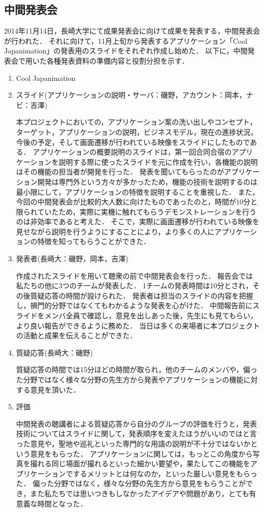 \subsection{中間発表会} 
\par
2014年11月14日，長崎大学にて成果発表会に向けて成果を発表する，中間発表会が行われた．
それに向けて，11月上旬から発表するアプリケーション「Cool Japanimation」の発表用のスライドをそれぞれ作成し始めた．
以下に，中間発表会で用いた各種発表資料の準備内容と役割分担を示す．
\begin{enumerate}
\item Cool Japanimation　
\par
\item スライド(アプリケーションの説明・サーバ：磯野，アカウント：岡本，ナビ：吉澤) 
\par
本プロジェクトにおいての，アプリケーション案の洗い出しやコンセプト，ターゲット，アプリケーションの説明，ビジネスモデル，現在の進捗状況，今後の予定，そして画面遷移が行われている映像をスライドにしたものである．
アプリケーションの概要説明のスライドは，第一回合同合宿のアプリケーションを説明する際に使ったスライドを元に作成を行い，各機能の説明はその機能の担当者が開発を行った．
発表を聞いてもらったのがアプリケーション開発は専門外という方々が多かったため，機能の技術を説明するのは最小限にして，アプリケーションの特徴を説明することを重視した．
また，今回の中間発表会が比較的大人数に向けたものであったのと，時間が10分と限られていたため，実際に実機に触れてもらうデモンストレーションを行うのは非効率であると考えた．
そこで，実際に画面遷移が行われている映像を見せながら説明を行うようにすることにより，より多くの人にアプリケーションの特徴を知ってもらうことができた．
\item 発表者(長崎大：磯野，岡本，吉澤)
\par
作成されたスライドを用いて聴衆の前で中間発表会を行った．
報告会では私たちの他に3つのチームが発表した．
1チームの発表時間は10分とされ，その後質疑応答の時間が設けられた．
発表者は担当のスライドの内容を把握し，損門的分野ではなくてもわかるような発表を心がけた．
中間報告前にスライドをメンバ全員で確認し，意見を出しあった後，先生にも見てもらい，より良い報告ができるように務めた．
当日は多くの来場者に本プロジェクトの活動と成果を伝えることができた． 
\item 質疑応答(長崎大：磯野) 
\par
質疑応答の時間では15分ほどの時間が取られ，他のチームのメンバや，偏った分野ではなく様々な分野の先生方から発表やアプリケーションの機能に対する意見を頂いた． 
\item 評価 
\par
中間発表の聴講者による質疑応答から自分のグループの評価を行うと，発表技術についてはスライドに関して，発表順序を変えたほうがいいのではと言った意見や，聖地や巡礼といった専門的な用語の説明が不十分ではないかという意見をもらった．
アプリケーションに関しては，もっとこの角度から写真を撮れる同じ場面が撮れるといった細かい要望や，果たしてこの機能をアプリケーションでするメリットとは何なのか，といった厳しい意見をもらった．
偏った分野ではなく，様々な分野の先生方から意見をもらうことができ，また私たちでは思いつきもしなかったアイデアや問題があり，とても有意義な時間となった．
\end{enumerate}　
\par
{}
